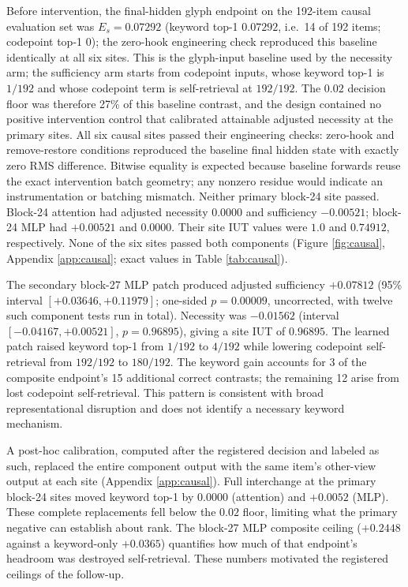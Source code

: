 \documentclass{article}
\begin{document}
Before intervention, the final-hidden glyph endpoint on the 192-item causal
evaluation set was $E_s=0.07292$ (keyword top-1 $0.07292$, i.e.\ 14 of 192
items; codepoint top-1 $0$); the zero-hook engineering check reproduced this
baseline identically at all six sites. This is the glyph-input baseline used
by the necessity arm; the sufficiency arm starts from codepoint inputs, whose
keyword top-1 is $1/192$ and whose codepoint term is self-retrieval at
$192/192$. The
$0.02$ decision floor was therefore 27\% of this baseline contrast, and the
design contained no positive intervention control that calibrated attainable
adjusted necessity at the primary sites. All six causal sites passed
their engineering checks: zero-hook and
remove-restore conditions reproduced the baseline final hidden state with
exactly zero RMS difference. Bitwise equality is expected because baseline
forwards reuse the exact intervention batch geometry; any nonzero residue
would indicate an instrumentation or batching mismatch. Neither primary block-24 site
passed. Block-24 attention had adjusted necessity $0.0000$ and sufficiency
$-0.00521$; block-24 MLP had $+0.00521$ and $0.0000$. Their site IUT values
were $1.0$ and $0.74912$, respectively. None of the six sites passed both
components (Figure \ref{fig:causal}, Appendix \ref{app:causal}; exact values
in Table \ref{tab:causal}).

The secondary block-27 MLP patch produced adjusted sufficiency $+0.07812$
(95\% interval $[+0.03646,+0.11979]$; one-sided $p=0.00009$, uncorrected,
with twelve such component tests run in total). Necessity was $-0.01562$ (interval
$[-0.04167,+0.00521]$, $p=0.96895$), giving a site IUT of $0.96895$.
The learned patch raised keyword top-1 from $1/192$ to $4/192$ while lowering
codepoint self-retrieval from $192/192$ to $180/192$. The keyword gain accounts
for 3 of the composite endpoint's 15 additional correct contrasts; the
remaining 12 arise from lost codepoint self-retrieval. This pattern is
consistent with broad representational disruption and does not identify a
necessary keyword mechanism.

A post-hoc calibration, computed after the registered decision and labeled as
such, replaced the entire component output with the same item's other-view
output at each site (Appendix \ref{app:causal}). Full interchange at the
primary block-24 sites moved keyword top-1 by $0.0000$ (attention) and
$+0.0052$ (MLP). These complete replacements fell below the $0.02$ floor,
limiting what the primary negative can establish about rank. The block-27
MLP composite ceiling ($+0.2448$ against a
keyword-only $+0.0365$) quantifies how much of that endpoint's headroom was
destroyed self-retrieval. These numbers motivated the registered ceilings of
the follow-up.
\end{document}
